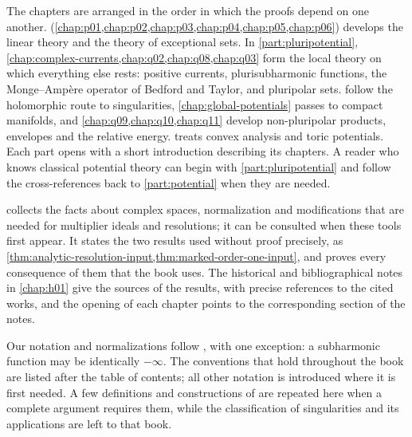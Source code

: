 The chapters are arranged in the order in which the proofs depend on one another.  (\cref{chap:p01,chap:p02,chap:p03,chap:p04,chap:p05,chap:p06}) develops the linear theory and the theory of exceptional sets. In \cref{part:pluripotential}, \cref{chap:complex-currents,chap:q02,chap:q08,chap:q03} form the local theory on which everything else rests: positive currents, plurisubharmonic functions, the Monge--Amp\`ere operator of Bedford and Taylor, and pluripolar sets.  follow the holomorphic route to singularities, \cref{chap:global-potentials} passes to compact manifolds, and \cref{chap:q09,chap:q10,chap:q11} develop non-pluripolar products, envelopes and the relative energy.  treats convex analysis and toric potentials. Each part opens with a short introduction describing its chapters. A reader who knows classical potential theory can begin with \cref{part:pluripotential} and follow the cross-references back to \cref{part:potential} when they are needed.

 collects the facts about complex spaces, normalization and modifications that are needed for multiplier ideals and resolutions; it can be consulted when these tools first appear. It states the two results used without proof precisely, as \cref{thm:analytic-resolution-input,thm:marked-order-one-input}, and proves every consequence of them that the book uses. The historical and bibliographical notes in \cref{chap:h01} give the sources of the results, with precise references to the cited works, and the opening of each chapter points to the corresponding section of the notes.

Our notation and normalizations follow \cite{XiaSampleBook}, with one exception: a subharmonic function may be identically $-\infty$. The conventions that hold throughout the book are listed after the table of contents; all other notation is introduced where it is first needed. A few definitions and constructions of \cite{XiaSampleBook} are repeated here when a complete argument requires them, while the classification of singularities and its applications are left to that book.
